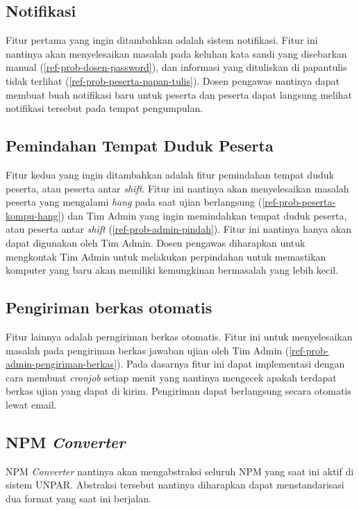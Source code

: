     \subsection{Notifikasi}
        Fitur pertama yang ingin ditambahkan adalah sistem notifikasi. Fitur ini nantinya akan menyelesaikan masalah pada keluhan kata sandi yang disebarkan manual (\ref{ref-prob-dosen-password}), dan informasi yang dituliskan di papantulis tidak terlihat (\ref{ref-prob-peserta-papan-tulis}). Dosen pengawas nantinya dapat membuat buah notifikasi baru untuk peserta dan peserta dapat langsung melihat notifikasi tersebut pada tempat pengumpulan.

    \subsection{Pemindahan Tempat Duduk Peserta}
        Fitur kedua yang ingin ditambahkan adalah fitur pemindahan tempat duduk peserta, atau peserta antar \textit{shift}. Fitur ini nantinya akan menyelesaikan masalah peserta yang mengalami \textit{hang} pada saat ujian berlangsung (\ref{ref-prob-peserta-kompu-hang}) dan Tim Admin yang ingin memindahkan tempat duduk peserta, atau peserta antar \textit{shift} (\ref{ref-prob-admin-pindah}). Fitur ini nantinya hanya akan dapat digunakan oleh Tim Admin. Dosen pengawas diharapkan untuk mengkontak Tim Admin untuk melakukan perpindahan untuk memastikan komputer yang baru akan memiliki kemungkinan bermasalah yang lebih kecil.

    \subsection{Pengiriman berkas otomatis}
        Fitur lainnya adalah perngiriman berkas otomatis. Fitur ini untuk menyelesaikan masalah pada pengiriman berkas jawaban ujian oleh Tim Admin (\ref{ref-prob-admin-pengiriman-berkas}). Pada dasarnya fitur ini dapat implementasi dengan cara membuat \textit{cronjob} setiap menit yang nantinya mengecek apakah terdapat berkas ujian yang dapat di kirim. Pengiriman dapat berlangsung secara otomatis lewat email.

    \subsection{NPM \textit{Converter}}
        NPM \textit{Converter} nantinya akan mengabstraksi seluruh NPM yang saat ini aktif di sistem UNPAR. Abstraksi tersebut nantinya diharapkan dapat menstandarisasi dua format yang saat ini berjalan.
        
